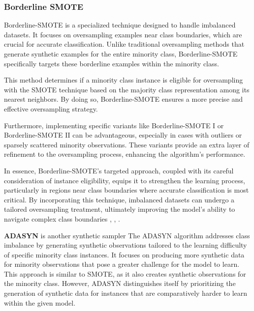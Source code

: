 \begin{comment}
	\begin{figure}[H]
	\label{fig:tube}
	\centering
	\texttt{[image: tube.jpg]}
	\caption{Conservation in thin long tube (3D), with variables varying only in one dimension (from C.P. Fall, 2005)}
	\end{figure}
\end{comment}


\subsubsection{Borderline SMOTE}

Borderline-SMOTE is a specialized technique designed to handle imbalanced datasets. It focuses on oversampling examples near class boundaries, which are crucial for accurate classification. Unlike traditional oversampling methods that generate synthetic examples for the entire minority class, Borderline-SMOTE specifically targets these borderline examples within the minority class.

This method determines if a minority class instance is eligible for oversampling with the SMOTE technique based on the majority class representation among its nearest neighbors. By doing so, Borderline-SMOTE ensures a more precise and effective oversampling strategy.

Furthermore, implementing specific variants like Borderline-SMOTE I or Borderline-SMOTE II can be advantageous, especially in cases with outliers or sparsely scattered minority observations. These variants provide an extra layer of refinement to the oversampling process, enhancing the algorithm's performance.

In essence, Borderline-SMOTE's targeted approach, coupled with its careful consideration of instance eligibility, equips it to strengthen the learning process, particularly in regions near class boundaries where accurate classification is most critical. By incorporating this technique, imbalanced datasets can undergo a tailored oversampling treatment, ultimately improving the model's ability to navigate complex class boundaries \cite{Nguyen2009}, \cite{Gupta2018}, \cite{Brandt2020}.




\textbf{ADASYN} is another synthetic sampler 
The ADASYN algorithm addresses class imbalance by generating synthetic observations tailored to the learning difficulty of specific minority class instances. It focuses on producing more synthetic data for minority observations that pose a greater challenge for the model to learn. This approach is similar to SMOTE, as it also creates synthetic observations for the minority class. However, ADASYN distinguishes itself by prioritizing the generation of synthetic data for instances that are comparatively harder to learn within the given model.

